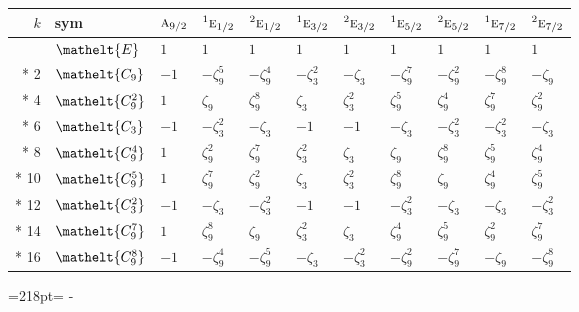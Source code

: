 \documentclass[10pt,a4paper]{article}
\newcommand{\needspace}[1]{\par\penalty-100\begingroup\dimen0=#1\relax\dimen2=\pagegoal
  \advance\dimen2-\pagetotal\ifdim\dimen0>\dimen2\relax\ifdim\dimen2>0pt\vfil\break\fi\fi
  \endgroup}
\numberwithin{equation}{section}
\newcommand{\eltfont}[1]{{\let\sigma\eltsigma\mathelt{#1}}}
\newcommand{\irr}[1]{\text{\normalfont\scshape #1}}
\newcommand{\conjpair}[1]{{}^{#1}}
\newcommand{\cls}[1]{\eltfont{#1}}
\newcommand{\rootunity}[1]{\zeta_{#1}}
\begin{document}
{\small\setlength{\tabcolsep}{4pt}
\begin{longtable}{@{}rllllllllll@{}}\toprule
$k$ & sym & $\irr{a}_{9/2}$ & $\conjpair{1}\irr{e}_{1/2}$ & $\conjpair{2}\irr{e}_{1/2}$ & $\conjpair{1}\irr{e}_{3/2}$ & $\conjpair{2}\irr{e}_{3/2}$ & $\conjpair{1}\irr{e}_{5/2}$ & $\conjpair{2}\irr{e}_{5/2}$ & $\conjpair{1}\irr{e}_{7/2}$ & $\conjpair{2}\irr{e}_{7/2}$\\\midrule\endhead
\bottomrule\endfoot\endlastfoot
0 & $\cls{E}$ & $1$ & $1$ & $1$ & $1$ & $1$ & $1$ & $1$ & $1$ & $1$\\*
2 & $\cls{C_{9}}$ & $-1$ & $-\rootunity{9}^{5}$ & $-\rootunity{9}^{4}$ & $-\rootunity{3}^{2}$ & $-\rootunity{3}$ & $-\rootunity{9}^{7}$ & $-\rootunity{9}^{2}$ & $-\rootunity{9}^{8}$ & $-\rootunity{9}$\\*
4 & $\cls{C_{9}^{2}}$ & $1$ & $\rootunity{9}$ & $\rootunity{9}^{8}$ & $\rootunity{3}$ & $\rootunity{3}^{2}$ & $\rootunity{9}^{5}$ & $\rootunity{9}^{4}$ & $\rootunity{9}^{7}$ & $\rootunity{9}^{2}$\\*
6 & $\cls{C_{3}}$ & $-1$ & $-\rootunity{3}^{2}$ & $-\rootunity{3}$ & $-1$ & $-1$ & $-\rootunity{3}$ & $-\rootunity{3}^{2}$ & $-\rootunity{3}^{2}$ & $-\rootunity{3}$\\*
8 & $\cls{C_{9}^{4}}$ & $1$ & $\rootunity{9}^{2}$ & $\rootunity{9}^{7}$ & $\rootunity{3}^{2}$ & $\rootunity{3}$ & $\rootunity{9}$ & $\rootunity{9}^{8}$ & $\rootunity{9}^{5}$ & $\rootunity{9}^{4}$\\*
10 & $\cls{C_{9}^{5}}$ & $1$ & $\rootunity{9}^{7}$ & $\rootunity{9}^{2}$ & $\rootunity{3}$ & $\rootunity{3}^{2}$ & $\rootunity{9}^{8}$ & $\rootunity{9}$ & $\rootunity{9}^{4}$ & $\rootunity{9}^{5}$\\*
12 & $\cls{C_{3}^{2}}$ & $-1$ & $-\rootunity{3}$ & $-\rootunity{3}^{2}$ & $-1$ & $-1$ & $-\rootunity{3}^{2}$ & $-\rootunity{3}$ & $-\rootunity{3}$ & $-\rootunity{3}^{2}$\\*
14 & $\cls{C_{9}^{7}}$ & $1$ & $\rootunity{9}^{8}$ & $\rootunity{9}$ & $\rootunity{3}^{2}$ & $\rootunity{3}$ & $\rootunity{9}^{4}$ & $\rootunity{9}^{5}$ & $\rootunity{9}^{2}$ & $\rootunity{9}^{7}$\\*
16 & $\cls{C_{9}^{8}}$ & $-1$ & $-\rootunity{9}^{4}$ & $-\rootunity{9}^{5}$ & $-\rootunity{3}$ & $-\rootunity{3}^{2}$ & $-\rootunity{9}^{2}$ & $-\rootunity{9}^{7}$ & $-\rootunity{9}$ & $-\rootunity{9}^{8}$\\
\bottomrule\end{longtable}}
\needspace{218pt}
\end{document}

